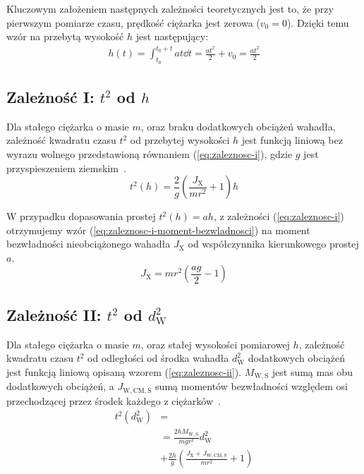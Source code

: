 \documentclass[twocolumn, a4paper, polish, 10pt]{article}
\newcommand{\JX}{\ensuremath{ J_{\mathrm{X}} }}
\newcommand{\JwCmS}{\ensuremath{ J_{\mathrm{W,CM,S}} }}
\newcommand{\MWS}{\ensuremath{ M_{\mathrm{W,S}} }}
\newcommand{\dwSq}{\ensuremath{ d_{\mathrm{W}}^2 }}
\begin{document}
Kluczowym założeniem następnych zależności teoretycznych jest to, że przy pierwszym pomiarze czasu, prędkość ciężarka jest zerowa ($v_0 = 0$). Dzięki temu wzór na przebytą wysokość $h$ jest następujący:
\begin{equation}
\begin{split}
    h(t) = \int_{t_0}^{t_0 + t} at \dd{t} = \frac{a t^2}{2} + v_0 = \frac{a t^2}{2}
\label{eq:przebyta-wysokosc}
\end{split}
\end{equation}

\subsection{Zależność I: \texorpdfstring{$t^2$}{t²} od \texorpdfstring{$h$}{h}}
Dla stałego ciężarka o masie $m$, oraz braku dodatkowych obciążeń wahadła, zależność kwadratu czasu $t^2$ od przebytej wysokości $h$ jest funkcją liniową bez wyrazu wolnego przedstawioną równaniem (\ref{eq:zaleznosc-i}), gdzie $g$ jest przyspieszeniem ziemskim~\cite{pracownia-fizyczna-m7}.
\begin{equation}
    t^2(h) = \frac{2}{g} \left( \frac{\JX}{m r^2} + 1 \right) h
\label{eq:zaleznosc-i}
\end{equation}

W przypadku dopasowania prostej $t^2(h) = ah$, z zależności (\ref{eq:zaleznosc-i}) otrzymujemy wzór (\ref{eq:zaleznosc-i-moment-bezwladnosci}) na moment bezwładności nieobciążonego wahadła $\JX$ od współczynnika kierunkowego prostej $a$.
\begin{equation}
    \JX = mr^2 \left( \frac{ag}{2} - 1 \right)
\label{eq:zaleznosc-i-moment-bezwladnosci}
\end{equation}

\subsection{Zależność II: \texorpdfstring{$t^2$}{t²} od \texorpdfstring{$\dwSq$}{dw²}}
Dla stałego ciężarka o masie $m$, oraz stałej wysokości pomiarowej $h$, zależność kwadratu czasu $t^2$ od odległości od środka wahadła $\dwSq$ dodatkowych obciążeń jest funkcją liniową opisaną wzorem (\ref{eq:zaleznosc-ii}). $\MWS$ jest sumą mas obu dodatkowych obciążeń, a $\JwCmS$ sumą momentów bezwładności względem osi przechodzącej przez środek każdego z ciężarków~\cite{pracownia-fizyczna-m7}.
\begin{equation}
\begin{split}
    t^2(\dwSq) &= \\
    &= \frac{2 h \MWS}{m g r^2} \dwSq \\
    &+ \frac{2h}{g} \left( \frac{\JX + \JwCmS}{m r^2} + 1\right)
\label{eq:zaleznosc-ii}
\end{split}
\end{equation}
\end{document}
